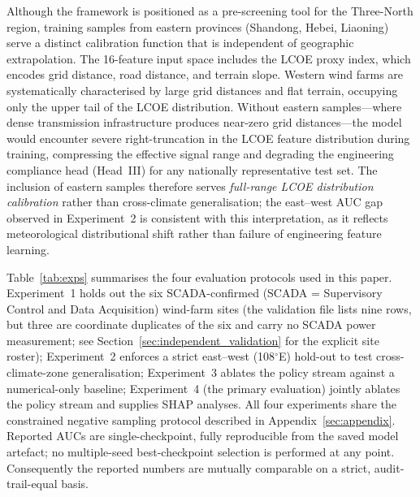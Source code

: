 \documentclass[12pt, a4paper]{article}
\begin{document}
Although the framework is positioned as a pre-screening tool for 
the Three-North region, training samples from eastern provinces 
(Shandong, Hebei, Liaoning) serve a distinct calibration function 
that is independent of geographic extrapolation. The 16-feature 
input space includes the LCOE proxy index, which encodes grid 
distance, road distance, and terrain slope. Western wind farms are 
systematically characterised by large grid distances and flat 
terrain, occupying only the upper tail of the LCOE distribution. 
Without eastern samples---where dense transmission infrastructure 
produces near-zero grid distances---the model would encounter 
severe right-truncation in the LCOE feature distribution during 
training, compressing the effective signal range and degrading the 
engineering compliance head (Head~III) for any nationally 
representative test set. The inclusion of eastern samples therefore 
serves \textit{full-range LCOE distribution calibration} rather 
than cross-climate generalisation; the east--west AUC gap observed 
in Experiment~2 is consistent with this interpretation, as it 
reflects meteorological distributional shift rather than failure of 
engineering feature learning.

Table~\ref{tab:exps} summarises the four evaluation
protocols used in this paper. Experiment~1 holds out the
six SCADA-confirmed (SCADA = Supervisory Control and Data
Acquisition) wind-farm sites (the validation file
lists nine rows, but three are coordinate duplicates of
the six and carry no SCADA power measurement; see
Section~\ref{sec:independent_validation} for the explicit
site roster); Experiment~2 enforces a strict
east--west (108$^\circ$E) hold-out to test cross-climate-zone
generalisation; Experiment~3 ablates the policy stream
against a numerical-only baseline; Experiment~4 (the
primary evaluation) jointly ablates the policy stream
and supplies SHAP analyses. All four experiments share
the constrained negative sampling protocol described in
Appendix~\ref{sec:appendix}. Reported AUCs are
single-checkpoint, fully reproducible from the saved
model artefact; no multiple-seed best-checkpoint
selection is performed at any point. Consequently the
reported numbers are mutually comparable on a strict,
audit-trail-equal basis.
\end{document}

